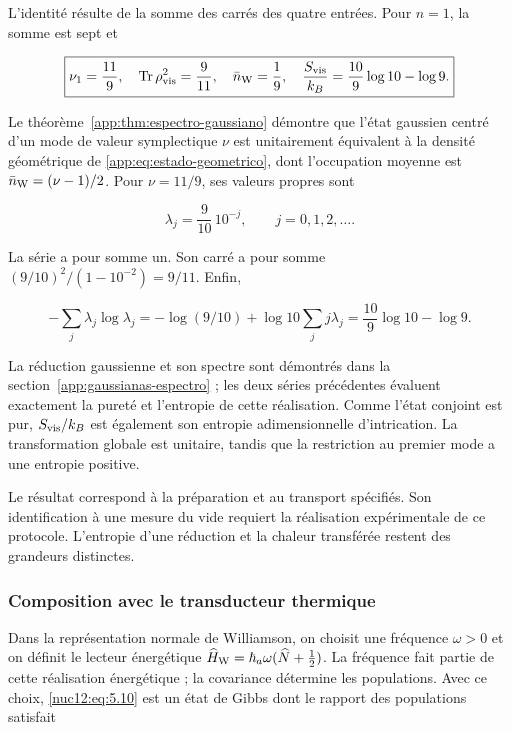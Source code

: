 L’identité résulte de la somme des carrés des quatre entrées. Pour \(n=1\), la somme est sept et



\begin{equation}
\boxed{\nu_1=\frac{11}{9},\quad
\operatorname{Tr}\rho_{\rm vis}^2=\frac9{11},\quad
\bar n_{\rm W}=\frac19,\quad
\frac{S_{\rm vis}}{k_B}=\frac{10}{9}\log10-\log9.}
\label{nuc12:eq:5.9}
\end{equation}



Le théorème~\ref{app:thm:espectro-gaussiano} démontre que l’état gaussien centré d’un mode de valeur symplectique \(\nu\) est unitairement équivalent à la densité géométrique de \eqref{app:eq:estado-geometrico}, dont l’occupation moyenne est \(\bar n_{\rm W}=(\nu-1)/2\). Pour \(\nu=11/9\), ses valeurs propres sont



\begin{equation}
\lambda_j=\frac9{10}\,10^{-j},\qquad j=0,1,2,\ldots.
\label{nuc12:eq:5.10}
\end{equation}



La série a pour somme un. Son carré a pour somme
\((9/10)^2/(1-10^{-2})=9/11\). Enfin,



\[
-\sum_j\lambda_j\log\lambda_j
=-\log(9/10)+\log10\sum_jj\lambda_j
=\frac{10}{9}\log10-\log9.
\]



La réduction gaussienne et son spectre sont démontrés dans la section~\ref{app:gaussianas-espectro} ; les deux séries précédentes évaluent exactement la pureté et l’entropie de cette réalisation. Comme l’état conjoint est pur, \(S_{\rm vis}/k_B\) est également son entropie adimensionnelle d’intrication. La transformation globale est unitaire, tandis que la restriction au premier mode a une entropie positive.

Le résultat correspond à la préparation et au transport spécifiés. Son identification à une mesure du vide requiert la réalisation expérimentale de ce protocole. L’entropie d’une réduction et la chaleur transférée restent des grandeurs distinctes.


\subsubsection{Composition avec le transducteur thermique}

Dans la représentation normale de Williamson, on choisit une fréquence \(\omega>0\) et on définit le lecteur énergétique
\(\widehat H_{\rm W}=\hbar_a\omega(\widehat N+\tfrac12)\). La fréquence fait partie de cette réalisation énergétique ; la covariance détermine les populations. Avec ce choix, \eqref{nuc12:eq:5.10} est un état de Gibbs dont le rapport des populations satisfait



